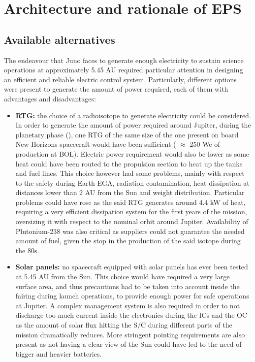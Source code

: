 \section{Architecture and rationale of EPS}
\label{sec:EPS_architecture_rationale}

\subsection{Available alternatives}
\label{subsec:available_alternatives}

The endeavour that Juno faces to generate enough electricity to sustain science operations at approximately 5.45 AU required particular attention in designing an efficient and reliable electric control system. Particularly, different options were present to generate the amount of power required, each of them with advantages and disadvantages:

\begin{itemize}
    \item \textbf{RTG:} the choice of a radioisotope to generate electricity could be considered. In order to generate the amount of power required around Jupiter, during the planetary phase 
    (\mref), 
    one RTG of the same size of the one present on board New Horizons spacecraft  would have been sufficient ( $\approx$ 250 We of production at BOL).\cite{nh_rtg} Electric power requirement would also be lower as some heat could have been routed to the propulsion section to heat up the tanks and fuel lines. This choice however had some problems, mainly with respect to the safety during Earth EGA, radiation contamination, heat dissipation at distances lower than 2 AU from the Sun and weight distribution. Particular problems could have rose as the said RTG generates around 4.4 kW of heat, requiring a very efficient dissipation system for the first years of the mission, oversizing it with respect to the nominal orbit around Jupiter. Availability of Plutonium-238 was also critical as suppliers could not guarantee the needed amount of fuel, given the stop in the production of the said isotope during the 80s.\cite{plutonium} 
    
    \item \textbf{Solar panels:} no spacecraft equipped with solar panels has ever been tested at 5.45 AU from the Sun. This choice would have required a very large surface area, and thus precautions had to be taken into account inside the fairing during launch operations, to provide enough power for safe operations at Jupiter. A complex management system is also required in order to not discharge too much current inside the electronics during the ICs and the OC as the amount of solar flux hitting the S/C during different parts of the mission dramatically reduces. More stringent pointing requirements are also present as not having a clear view of the Sun could have led to the need of bigger and heavier batteries. 
\end{itemize}

